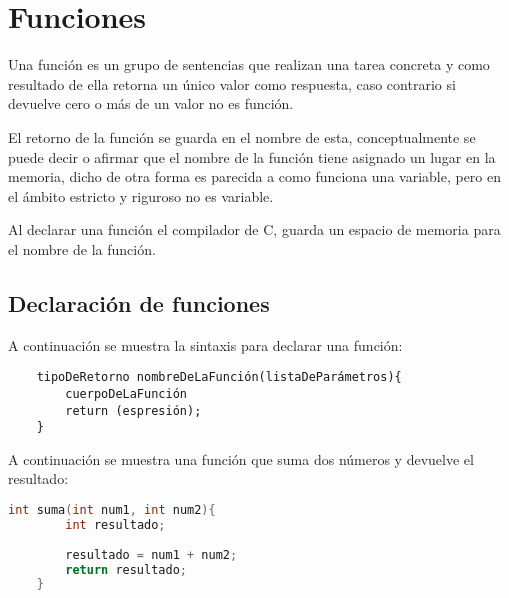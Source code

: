 \chapter[Funciones]{Funciones}
\raggedright
Una función es un grupo de sentencias que realizan una tarea concreta y como resultado de ella retorna un único valor como respuesta, caso contrario si devuelve cero o más de un valor no es función.

\vspace{1em}
El retorno de la función se guarda en el nombre de esta, conceptualmente se puede decir o afirmar que el nombre de la función tiene asignado un lugar en la memoria, dicho de otra forma es parecida a como funciona una variable, pero en el ámbito estricto y riguroso no es variable.

\vspace{1em}
Al declarar una función el compilador de C, guarda un espacio de memoria para el nombre de la función.

\section[Declaración]{Declaración de funciones}
A continuación se muestra la sintaxis para declarar una función:
 
\begin{verbatim}
	tipoDeRetorno nombreDeLaFunción(listaDeParámetros){
		cuerpoDeLaFunción
		return (espresión);
	}
\end{verbatim}

A continuación se muestra una función que suma dos números y devuelve el resultado:

\begin{lstlisting}[language=C, caption={Función que suma dos números y devuelve el resultado}, style=codigoenc]
	int suma(int num1, int num2){
		int resultado;
		
		resultado = num1 + num2;
		return resultado;
	}
\end{lstlisting}	
